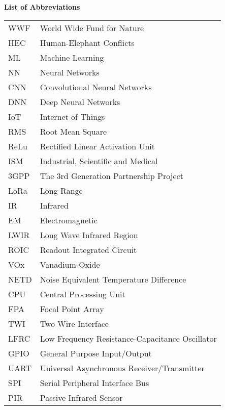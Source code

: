 \begin{poglavje}
\noindent\bfseries List of Abbreviations
\end{poglavje}
\bigskip
\bigskip
\bigskip
\bigskip
\bigskip

\begingroup
\renewcommand\arraystretch{1.3}
\begin{flushleft}
    \begin{longtable}[l]{p{2.5cm}l}
        WWF     & World Wide Fund for Nature\\
        HEC     & Human-Elephant Conflicts\\
        ML      & Machine Learning\\
        NN      & Neural Networks\\
        CNN     & Convolutional Neural Networks\\
        DNN     & Deep Neural Networks\\
        IoT     & Internet of Things\\
        RMS     & Root Mean Square\\
        ReLu    & Rectified Linear Activation Unit\\
        ISM     & Industrial, Scientific and Medical\\
        3GPP    & The 3rd Generation Partnership Project\\
        LoRa    & Long Range\\
        IR      & Infrared\\
        EM      & Electromagnetic\\
        LWIR    & Long Wave Infrared Region\\
        ROIC    & Readout Integrated Circuit\\
        VOx     & Vanadium-Oxide\\
        NETD    & Noise Equivalent Temperature Difference\\
        CPU     & Central Processing Unit\\
        FPA     & Focal Point Array\\
        TWI     & Two Wire Interface\\
        LFRC    & Low Frequency Resistance-Capacitance Oscillator\\
        GPIO    & General Purpose Input/Output\\
        UART    & Universal Asynchronous Receiver/Transmitter\\
        SPI     & Serial Peripheral Interface Bus\\
        PIR     & Passive Infrared Sensor\\

\end{longtable}
\end{flushleft}
